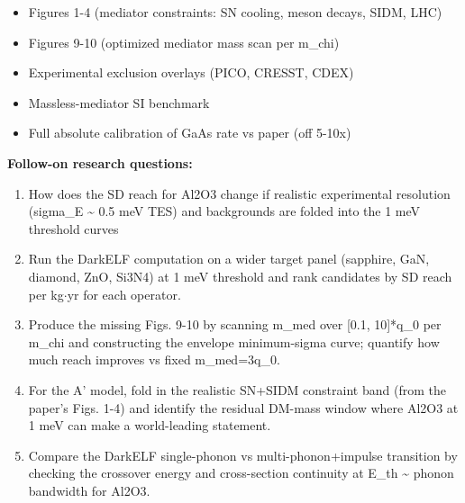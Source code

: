\documentclass[11pt]{article}
\begin{document}
\begin{itemize}[leftmargin=1.4em,itemsep=0.2em,topsep=0.2em]
\item Figures 1-4 (mediator constraints: SN cooling, meson decays, SIDM, LHC)
\item Figures 9-10 (optimized mediator mass scan per m\_chi)
\item Experimental exclusion overlays (PICO, CRESST, CDEX)
\item Massless-mediator SI benchmark
\item Full absolute calibration of GaAs rate vs paper (off 5-10x)
\end{itemize}\noindent\textbf{Follow-on research questions:}
\begin{enumerate}[leftmargin=1.6em,itemsep=0.2em,topsep=0.2em,label=Q\arabic*.]
\item How does the SD reach for Al2O3 change if realistic experimental resolution (sigma\_E \textasciitilde{} 0.5 meV TES) and backgrounds are folded into the 1 meV threshold curves
\item Run the DarkELF computation on a wider target panel (sapphire, GaN, diamond, ZnO, Si3N4) at 1 meV threshold and rank candidates by SD reach per kg$\cdot$yr for each operator.
\item Produce the missing Figs. 9-10 by scanning m\_med over [0.1, 10]*q\_0 per m\_chi and constructing the envelope minimum-sigma curve; quantify how much reach improves vs fixed m\_med=3q\_0.
\item For the A' model, fold in the realistic SN+SIDM constraint band (from the paper's Figs. 1-4) and identify the residual DM-mass window where Al2O3 at 1 meV can make a world-leading statement.
\item Compare the DarkELF single-phonon vs multi-phonon+impulse transition by checking the crossover energy and cross-section continuity at E\_th \textasciitilde{} phonon bandwidth for Al2O3.
\end{enumerate}
\end{document}
